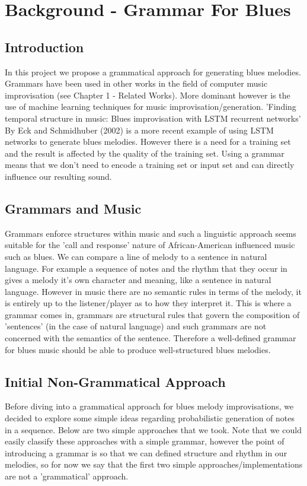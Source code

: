 \documentclass[pdftex,12pt,a4paper]{report}
\begin{document}
\pagebreak

\chapter{Background - Grammar For Blues}

\section{Introduction}
In this project we propose a grammatical approach for generating blues melodies. Grammars have been used in other works in the field of computer music improvisation (see Chapter 1 - Related Works). More dominant however is the use of machine learning techniques for music improvisation/generation. 'Finding temporal structure in music: Blues improvisation with LSTM recurrent networks' By Eck and Schmidhuber (2002) \cite{eck02} is a more recent example of using LSTM networks to generate blues melodies. However there is a need for a training set and the result is affected by the quality of the training set. Using a grammar means that we don't need to encode a training set or input set and can directly influence our resulting sound.

\section{Grammars and Music}
Grammars enforce structures within music and such a linguistic approach seems suitable for the 'call and response' nature of African-American influenced music such as blues. We can compare a line of melody to a sentence in natural language. For example a sequence of notes and the rhythm that they occur in gives a melody it's own character and meaning, like a sentence in natural language. However in music there are no semantic rules in terms of the melody, it is entirely up to the listener/player as to how they interpret it. This is where a grammar comes in, grammars are structural rules that govern the composition of 'sentences' (in the case of natural language) and such grammars are not concerned with the semantics of the sentence. Therefore a well-defined grammar for blues music should be able to produce well-structured blues melodies.


\section{Initial Non-Grammatical Approach}
Before diving into a grammatical approach for blues melody improvisations, we decided to explore some simple ideas regarding probabilistic generation of notes in a sequence. Below are two simple approaches that we took. Note that we could easily classify these approaches with a simple grammar, however the point of introducing a grammar is so that we can defined structure and rhythm in our melodies, so for now we say that the first two simple approaches/implementations are not a 'grammatical' approach.
\end{document}
